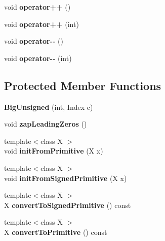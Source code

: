 \begin{DoxyCompactItemize}
void {\bfseries operator++} ()
\item 
\mbox{\label{class_big_unsigned_a43a9b157a3f39789165f7c6cabc32790}} 
void {\bfseries operator++} (int)
\item 
\mbox{\label{class_big_unsigned_ad5fffc8803d80ac4bdebad83d87afe95}} 
void {\bfseries operator-\/-\/} ()
\item 
\mbox{\label{class_big_unsigned_a6e21345fcbac102793c641b66c360c25}} 
void {\bfseries operator-\/-\/} (int)
\end{DoxyCompactItemize}
\subsection*{Protected Member Functions}
\begin{DoxyCompactItemize}
\item 
\mbox{\label{class_big_unsigned_a852ddb9aa11e4a3d77b22cc744cf6e71}} 
{\bfseries Big\+Unsigned} (int, Index c)
\item 
\mbox{\label{class_big_unsigned_a4bc40738d0b403db5799bd71438435ae}} 
void {\bfseries zap\+Leading\+Zeros} ()
\item 
\mbox{\label{class_big_unsigned_a4bdb0e629de6027773a6779a27f3f610}} 
{\footnotesize template$<$class X $>$ }\\void {\bfseries init\+From\+Primitive} (X x)
\item 
\mbox{\label{class_big_unsigned_ad13024143239f2e265efcae5e042a354}} 
{\footnotesize template$<$class X $>$ }\\void {\bfseries init\+From\+Signed\+Primitive} (X x)
\item 
\mbox{\label{class_big_unsigned_aa91858e9eb19f08a9b047b5bb08ad012}} 
{\footnotesize template$<$class X $>$ }\\X {\bfseries convert\+To\+Signed\+Primitive} () const
\item 
\mbox{\label{class_big_unsigned_af955e5221b5bf2f7efffa988aeedb387}} 
{\footnotesize template$<$class X $>$ }\\X {\bfseries convert\+To\+Primitive} () const
\end{DoxyCompactItemize}

